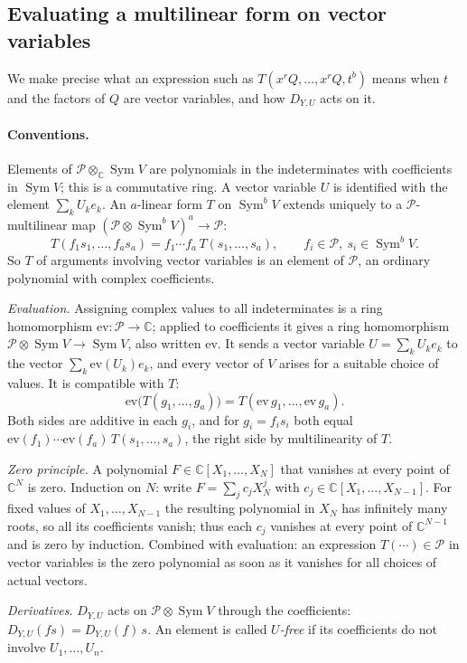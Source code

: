 \documentclass[11pt]{article}
\theoremstyle{remark}
\DeclareMathOperator{\Sym}{Sym}
\newcommand{\C}{\mathbb C}
\newcommand{\D}[2]{D_{#1,#2}}
\newcommand{\PP}{\mathcal P}
\begin{document}
\subsection{Evaluating a multilinear form on vector variables}

We make precise what an expression such as $T(x^rQ,\dots,x^rQ,t^b)$ means
when $t$ and the factors of $Q$ are vector variables, and how $\D{Y}{U}$
acts on it.

\paragraph{Conventions.}
Elements of $\PP\otimes_\C\Sym V$ are polynomials in the indeterminates with
coefficients in $\Sym V$; this is a commutative ring. A vector variable $U$
is identified with the element $\sum_kU_ke_k$. An $a$-linear form $T$ on
$\Sym^bV$ extends uniquely to a $\PP$-multilinear map
$(\PP\otimes\Sym^bV)^a\to\PP$:
\[
 T(f_1s_1,\dots,f_as_a)=f_1\cdots f_a\,T(s_1,\dots,s_a),
 \qquad f_i\in\PP,\ s_i\in\Sym^bV .
\]
So $T$ of arguments involving vector variables is an element of $\PP$, an
ordinary polynomial with complex coefficients.

\emph{Evaluation.} Assigning complex values to all indeterminates is a ring
homomorphism $\mathrm{ev}\colon\PP\to\C$; applied to coefficients it gives
a ring homomorphism $\PP\otimes\Sym V\to\Sym V$, also written
$\mathrm{ev}$. It sends a vector variable $U=\sum_kU_ke_k$ to the vector
$\sum_k\mathrm{ev}(U_k)e_k$, and every vector of $V$ arises for a suitable
choice of values. It is compatible with $T$:
\[
 \mathrm{ev}\bigl(T(g_1,\dots,g_a)\bigr)
 =T(\mathrm{ev}\,g_1,\dots,\mathrm{ev}\,g_a).
\]
Both sides are additive in each $g_i$, and for $g_i=f_is_i$ both equal
$\mathrm{ev}(f_1)\cdots\mathrm{ev}(f_a)\,T(s_1,\dots,s_a)$, the right side
by multilinearity of $T$.

\emph{Zero principle.} A polynomial $F\in\C[X_1,\dots,X_N]$ that vanishes
at every point of $\C^N$ is zero. Induction on $N$: write
$F=\sum_jc_jX_N^j$ with $c_j\in\C[X_1,\dots,X_{N-1}]$. For fixed values of
$X_1,\dots,X_{N-1}$ the resulting polynomial in $X_N$ has infinitely many
roots, so all its coefficients vanish; thus each $c_j$ vanishes at every
point of $\C^{N-1}$ and is zero by induction. Combined with evaluation: an
expression $T(\cdots)\in\PP$ in vector variables is the zero polynomial as
soon as it vanishes for all choices of actual vectors.

\emph{Derivatives.} $\D{Y}{U}$ acts on $\PP\otimes\Sym V$ through the
coefficients: $\D{Y}{U}(fs)=\D{Y}{U}(f)\,s$. An element is called
\emph{$U$-free} if its coefficients do not involve $U_1,\dots,U_n$.
\end{document}
